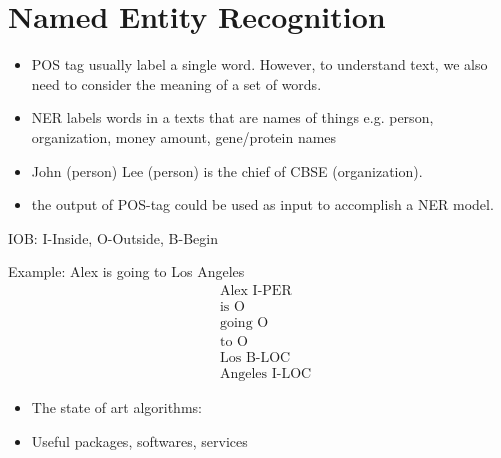 \documentclass[12pt, oneside]{article}
\begin{document}
\section{Named Entity Recognition}
\begin{itemize}
\item POS tag usually label a single word. However, to understand text, we also need to consider the meaning of a set of words.
\item NER labels words in a texts that are names of things e.g. person, organization, money amount, gene/protein names
\item John (person) Lee (person) is the chief of CBSE (organization). 
\item the output of POS-tag could be used as input to accomplish a NER model.
\end{itemize}

IOB: I-Inside, O-Outside, B-Begin

Example: Alex is going to Los Angeles
\begin{align*}
&\text{Alex I-PER}\\
&\text{is O}\\
&\text{going O}\\
&\text{to O}\\
&\text{Los B-LOC}\\
&\text{Angeles I-LOC}
\end{align*}

\begin{itemize}
\item The state of art algorithms:
\item Useful packages, softwares, services
\end{itemize}
\end{document}
